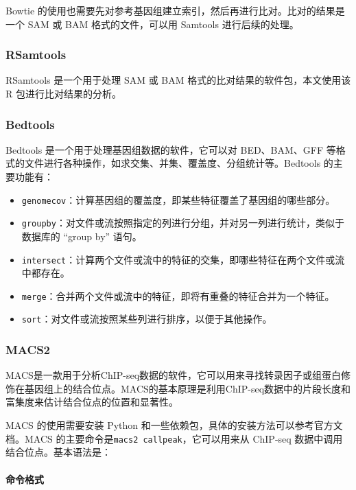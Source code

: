 \documentclass[UTF8]{ctexart}
\begin{document}
Bowtie 的使用也需要先对参考基因组建立索引，然后再进行比对。比对的结果是一个 SAM 或 BAM 格式的文件，可以用 Samtools 进行后续的处理。

\subsubsection{RSamtools}

RSamtools 是一个用于处理 SAM 或 BAM 格式的比对结果的软件包，本文使用该 R 包进行比对结果的分析。

\subsubsection{Bedtools}

Bedtools 是一个用于处理基因组数据的软件，它可以对 BED、BAM、GFF 等格式的文件进行各种操作，如求交集、并集、覆盖度、分组统计等。Bedtools 的主要功能有：

\begin{itemize}
	\item \verb|genomecov|：计算基因组的覆盖度，即某些特征覆盖了基因组的哪些部分。
	\item \verb|groupby|：对文件或流按照指定的列进行分组，并对另一列进行统计，类似于数据库的 “group by” 语句。
	\item \verb|intersect|：计算两个文件或流中的特征的交集，即哪些特征在两个文件或流中都存在。
	\item \verb|merge|：合并两个文件或流中的特征，即将有重叠的特征合并为一个特征。
	\item \verb|sort|：对文件或流按照某些列进行排序，以便于其他操作。
\end{itemize}

\subsubsection{MACS2}

MACS是一款用于分析ChIP-seq数据的软件，它可以用来寻找转录因子或组蛋白修饰在基因组上的结合位点。MACS的基本原理是利用ChIP-seq数据中的片段长度和富集度来估计结合位点的位置和显著性。

MACS 的使用需要安装 Python 和一些依赖包，具体的安装方法可以参考官方文档。MACS 的主要命令是\verb|macs2 callpeak|，它可以用来从 ChIP-seq 数据中调用结合位点。基本语法是：

\paragraph*{命令格式}
\end{document}
